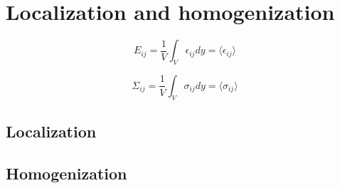 \section{Localization and homogenization}

\begin{equation}
E_{ij} = \frac{1}{V}\int_{V}\epsilon_{ij}dy = \langle \epsilon_{ij} \rangle
\end{equation}

\begin{equation}
\Sigma_{ij} = \frac{1}{V}\int_{V}\sigma_{ij}dy = \langle \sigma_{ij} \rangle
\end{equation}

\subsection{Localization}


\subsection{Homogenization}



